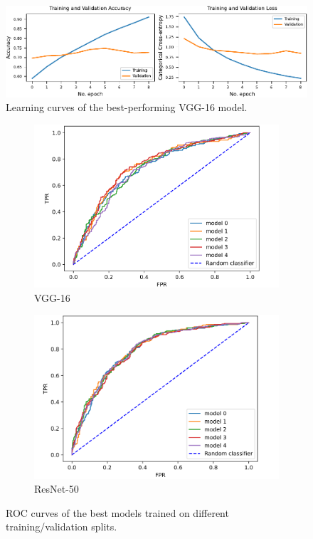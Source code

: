 \documentclass[sn-mathphys,Numbered]{sn-jnl}%
\theoremstyle{thmstyleone}%
\theoremstyle{thmstyletwo}%
\theoremstyle{thmstylethree}%
\begin{document}
\begin{figure}[ht]%
\centering
\includegraphics[width=1.0\textwidth]{VGG16_BaseModel-Adam_results_0.00001.pdf}
\caption{Learning curves of the best-performing VGG-16 model.}
\label{VGG-16_best}
\end{figure}
\begin{figure}[ht]
  \begin{subfigure}{0.5\textwidth}
    \includegraphics[width=\linewidth]{final_roc.png}
    \caption{VGG-16}
  \end{subfigure}%
  \begin{subfigure}{0.5\textwidth}
    \includegraphics[width=\linewidth]{final_ROC_ResNet50.png}
    \caption{ResNet-50}
  \end{subfigure}
  \caption{ROC curves of the best models trained on different training/validation splits.}
  \label{fig:ROC_curves}
\end{figure}
\end{document}
